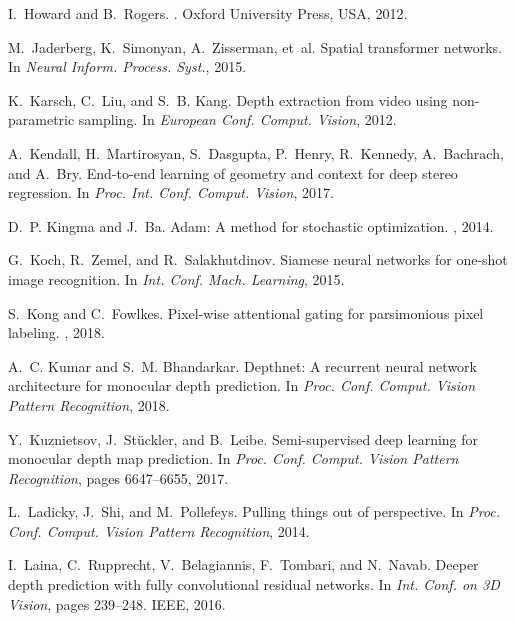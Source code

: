 \documentclass[10pt,twocolumn,letterpaper]{article}
\begin{document}
{\begin{thebibliography}{10}
I.~Howard and B.~Rogers.
.
\newblock Oxford University Press, USA, 2012.

M.~Jaderberg, K.~Simonyan, A.~Zisserman, et~al.
\newblock Spatial transformer networks.
\newblock In {\em Neural Inform. Process. Syst.}, 2015.

K.~Karsch, C.~Liu, and S.~B. Kang.
\newblock Depth extraction from video using non-parametric sampling.
\newblock In {\em European Conf. Comput. Vision}, 2012.

A.~Kendall, H.~Martirosyan, S.~Dasgupta, P.~Henry, R.~Kennedy, A.~Bachrach, and
  A.~Bry.
\newblock End-to-end learning of geometry and context for deep stereo
  regression.
\newblock In {\em Proc. Int. Conf. Comput. Vision}, 2017.

D.~P. Kingma and J.~Ba.
\newblock Adam: A method for stochastic optimization.
, 2014.

G.~Koch, R.~Zemel, and R.~Salakhutdinov.
\newblock Siamese neural networks for one-shot image recognition.
\newblock In {\em Int. Conf. Mach. Learning}, 2015.

S.~Kong and C.~Fowlkes.
\newblock Pixel-wise attentional gating for parsimonious pixel labeling.
, 2018.

A.~C. Kumar and S.~M. Bhandarkar.
\newblock Depthnet: A recurrent neural network architecture for monocular depth
  prediction.
\newblock In {\em Proc. Conf. Comput. Vision Pattern Recognition}, 2018.

Y.~Kuznietsov, J.~St{\"u}ckler, and B.~Leibe.
\newblock Semi-supervised deep learning for monocular depth map prediction.
\newblock In {\em Proc. Conf. Comput. Vision Pattern Recognition}, pages
  6647--6655, 2017.

L.~Ladicky, J.~Shi, and M.~Pollefeys.
\newblock Pulling things out of perspective.
\newblock In {\em Proc. Conf. Comput. Vision Pattern Recognition}, 2014.

I.~Laina, C.~Rupprecht, V.~Belagiannis, F.~Tombari, and N.~Navab.
\newblock Deeper depth prediction with fully convolutional residual networks.
\newblock In {\em Int. Conf. on 3D Vision}, pages 239--248. IEEE, 2016.


\end{thebibliography}}
\end{document}
